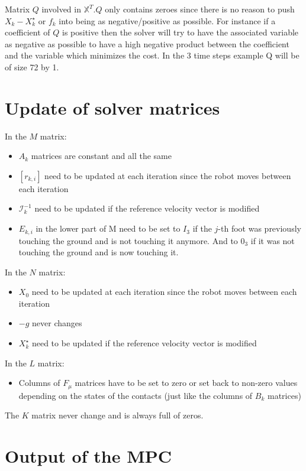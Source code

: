 \documentclass[a4paper,11pt]{article}
\begin{document}
Matrix $Q$ involved in $\mathbb{X}^T.Q$ only contains zeroes since there is no reason to push $X_k - X_k^\star$ or $f_k$ into being as negative/positive as possible. For instance if a coefficient of $Q$ is positive then the solver will try to have the associated variable as negative as possible to have a high negative product between the coefficient and the variable which minimizes the cost. In the 3 time steps example Q will be of size 72 by 1.

\section*{Update of solver matrices}

In the $M$ matrix:
\begin{itemize}
\item $A_k$ matrices are constant and all the same
\item $[r_{k,i}]$ need to be updated at each iteration since the robot moves between each iteration
\item $\mathcal{I}_k^{-1}$ need to be updated if the reference velocity vector is modified
\item $E_{k,i}$ in the lower part of M need to be set to $I_3$ if the $j$-th foot was previously touching the ground and is not touching it anymore. And to $0_3$ if it was not touching the ground and is now touching it.
\end{itemize}

In the $N$ matrix:
\begin{itemize}
	\item $X_0$ need to be updated at each iteration since the robot moves between each iteration
	\item $- g$ never changes
	\item $X_k^\star$ need to be updated if the reference velocity vector is modified
\end{itemize}

In the $L$ matrix:
\begin{itemize}
	\item Columns of $F_\mu$ matrices have to be set to zero or set back to non-zero values depending on the states of the contacts (just like the columns of $B_k$ matrices)
\end{itemize}

The $K$ matrix never change and is always full of zeros.

\section*{Output of the MPC}
\end{document}
